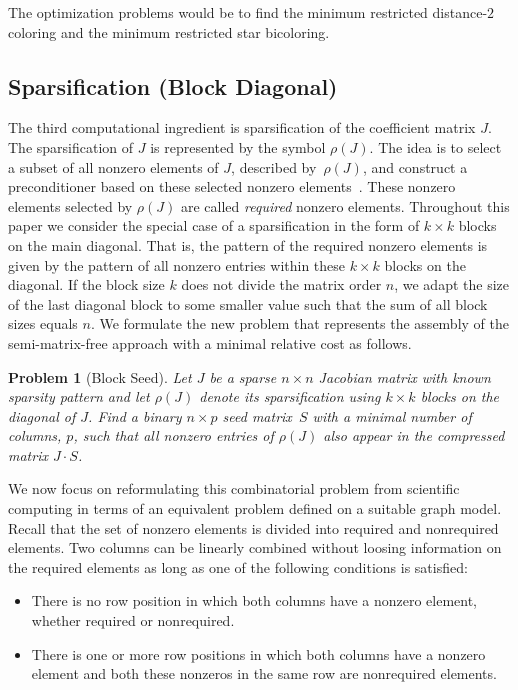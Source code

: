 \documentclass[12pt, oneside]{book}
\newtheorem{problem}{Problem}
\newcommand{\sparsifysymbol}{\ensuremath{\rho}}
\newcommand{\sparsify}[1]{\ensuremath{\sparsifysymbol(#1)}}
\begin{document}
The optimization problems would be to 
find the minimum restricted distance-$2$ coloring
and the minimum restricted star bicoloring.
\subsection{Sparsification (Block Diagonal)}
The third computational ingredient is sparsification of the coefficient matrix $J$. The
sparsification of $J$ is represented by the symbol \sparsify{J}. The idea is to select a
subset of all nonzero elements of $J$, described by~\sparsify{J}, and construct a
preconditioner based on these selected nonzero elements~\cite{Cullum2006}. These nonzero
elements selected by \sparsify{J} are called \emph{required} nonzero elements. Throughout
this paper we consider the special case of a sparsification in the form of $k\times k$
blocks on the main diagonal. That is, the pattern of the required nonzero elements is
given by the pattern of all nonzero entries within these $k\times k$ blocks on the
diagonal. If the block size $k$ does not divide the matrix order $n$, we adapt the size
of the last diagonal block to some smaller value such that the sum of all block sizes
equals $n$. We formulate the new problem that represents the assembly of the
semi-matrix-free approach with a minimal relative cost as follows.
%
\begin{problem}[Block Seed]
\label{p:block}
%
Let $J$ be a sparse $n \times n$ Jacobian matrix with known sparsity pattern and let
\sparsify{J} denote its sparsification using $k \times k$ blocks on the diagonal of $J$.
Find a binary $n \times p$ seed matrix~$S$ with a minimal number of columns, $p$, such
that all nonzero entries of \sparsify{J} also appear in the compressed matrix $J \cdot
S$.
\end{problem}

We now focus on reformulating this combinatorial problem from
scientific computing in terms of an equivalent problem defined on a suitable graph model.
Recall that the set of nonzero elements is divided into required and nonrequired
elements. Two columns can be linearly combined without loosing information on the
required elements as long as one of the following conditions is satisfied:
\begin{itemize}
  \item There is no row position in which both columns have a nonzero element, whether
      required or nonrequired.
  \item There is one or more row positions in which both columns have a nonzero element
      and both these nonzeros in the same row are nonrequired elements.
\end{itemize}
\end{document}
